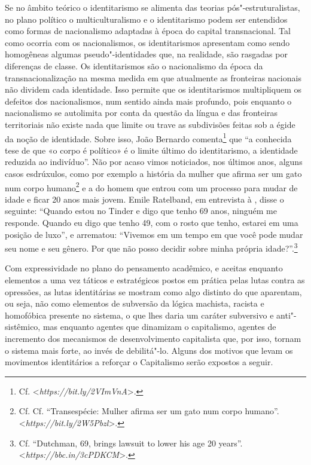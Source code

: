 Se no âmbito teórico o identitarismo se alimenta das teorias
pós"-estruturalistas, no plano político o multiculturalismo e o
identitarismo podem ser entendidos como formas de nacionalismo adaptadas
à época do capital transnacional. Tal como ocorria com os nacionalismos,
os identitarismos apresentam como sendo homogêneas algumas
pseudo"-identidades que, na realidade, são rasgadas por diferenças de
classe. Os identitarismos são o nacionalismo da época da
transnacionalização na mesma medida em que atualmente as fronteiras
nacionais não dividem cada identidade. Isso permite que os
identitarismos multipliquem os defeitos dos nacionalismos, num sentido
ainda mais profundo, pois enquanto o nacionalismo se autolimita por
conta da questão da língua e das fronteiras territoriais não existe nada
que limite ou trave as subdivisões feitas sob a égide da noção de
identidade. Sobre isso, João Bernardo comenta\footnote{Cf.
  \textless{}\emph{https://bit.ly/2VImVnA}\textgreater{}.} que
``a conhecida tese de que «o corpo é político» é o limite último do
identitarismo, a identidade reduzida ao indivíduo''. Não por acaso vimos
noticiados, nos últimos anos, alguns casos esdrúxulos, como por exemplo
a história da mulher que afirma ser um gato num corpo humano\footnote{Cf.
  Cf. ``Transespécie: Mulher afirma ser um gato num corpo humano''.
  \textless{}\emph{https://bit.ly/2W5Pbzl}\textgreater{}.} e a do homem que
entrou com um processo para mudar de idade e ficar 20 anos mais jovem.
Emile Ratelband, em entrevista à , disse o seguinte: ``Quando estou
no Tinder e digo que tenho 69 anos, ninguém me responde. Quando eu digo
que tenho 49, com o rosto que tenho, estarei em uma posição de luxo'', e
arrematou: ``Vivemos em um tempo em que você pode mudar seu nome e seu
gênero. Por que não posso decidir sobre minha própria
idade?''.\footnote{Cf. ``Dutchman, 69, brings lawsuit to lower his age
  20 years''. \textless{}\emph{https://bbc.in/3cPDKCM}\textgreater{}.}

Com expressividade no plano do pensamento acadêmico, e aceitas enquanto
elementos a uma vez táticos e estratégicos postos em prática pelas lutas
contra as opressões, as lutas identitárias se mostram como algo distinto
do que aparentam, ou seja, não como elementos de subversão da lógica
machista, racista e homofóbica presente no sistema, o que lhes daria um
caráter subversivo e anti"-sistêmico, mas enquanto agentes que dinamizam
o capitalismo, agentes de incremento dos mecanismos de desenvolvimento
capitalista que, por isso, tornam o sistema mais forte, ao invés de
debilitá"-lo. Alguns dos motivos que levam os movimentos identitários a
reforçar o Capitalismo serão expostos a seguir.

